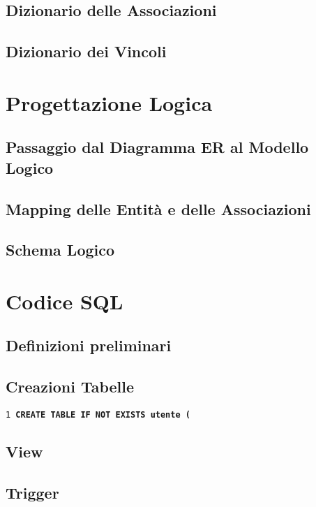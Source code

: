 \documentclass[a4paper,12pt,oneside]{book}
\begin{document}
    \section{Dizionario delle Associazioni}
    \section{Dizionario dei Vincoli}

    \chapter{Progettazione Logica}
    \section{Passaggio dal Diagramma ER al Modello Logico}
    \section{Mapping delle Entità e delle Associazioni}
    \section{Schema Logico}
    \chapter{Codice SQL}
    \section{Definizioni preliminari}
    \section{Creazioni Tabelle}

    \texttt{1 \bfseries{CREATE TABLE IF NOT EXISTS} utente (}
    \section{View}
    \section{Trigger}
    \label{sec:Intro}
\end{document}
